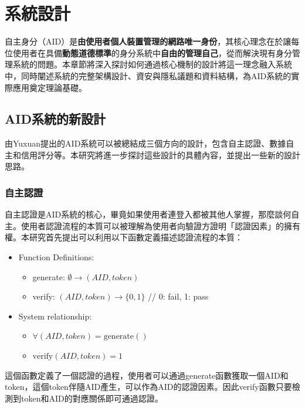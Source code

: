
\chapter{系統設計}
自主身分（AID）是\textbf{由使用者個人裝置管理的網路唯一身份}，其核心理念在於讓每位使用者在具備\textbf{動態道德標準}的身分系統中\textbf{自由的管理自己}，從而解決現有身分管理系統的問題。本章節將深入探討如何通過核心機制的設計將這一理念融入系統中，同時闡述系統的完整架構設計、資安與隱私議題和資料結構，為AID系統的實際應用奠定理論基礎。
\section{AID系統的新設計}
由Yuxuan\cite{ntu-lin2014autonomous}提出的AID系統可以被總結成三個方向的設計，包含自主認證、數據自主和信用評分等。本研究將進一步探討這些設計的具體內容，並提出一些新的設計思路。
\subsection{自主認證}
自主認證是AID系統的核心，畢竟如果使用者連登入都被其他人掌握，那麼談何自主。使用者認證流程的本質可以被理解為使用者向驗證方證明「認證因素」\cite{AlQahtani2021AF}的擁有權。本研究首先提出可以利用以下函數定義描述認證流程的本質：
\begin{itemize}
  \item Function Definitions:
  \begin{itemize}
      \item generate: $\emptyset \rightarrow (AID, token)$
      \item verify: $(AID, token) \rightarrow \{0,1\}$ \hfill // 0: fail, 1: pass
  \end{itemize}
  \item System relationship:
  \begin{itemize}
      \item $\forall(AID, token) = \text{generate}()$
      \item $\text{verify}(AID, token) = 1$
  \end{itemize}
\end{itemize}
這個函數定義了一個認證的過程，使用者可以通過generate函數獲取一個AID和token，這個token伴隨AID產生，可以作為AID的認證因素。因此verify函數只要檢測到token和AID的對應關係即可通過認證。

